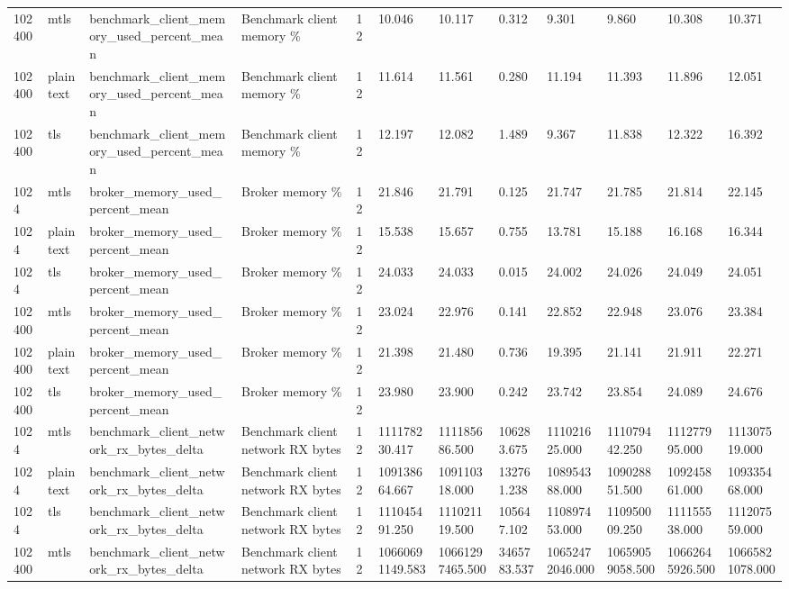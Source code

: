 \begin{longtable}{llllllllllll}
102400 & mtls & benchmark\_client\_memory\_used\_percent\_mean & Benchmark client memory \% & 12 & 10.046 & 10.117 & 0.312 & 9.301 & 9.860 & 10.308 & 10.371 \\
102400 & plaintext & benchmark\_client\_memory\_used\_percent\_mean & Benchmark client memory \% & 12 & 11.614 & 11.561 & 0.280 & 11.194 & 11.393 & 11.896 & 12.051 \\
102400 & tls & benchmark\_client\_memory\_used\_percent\_mean & Benchmark client memory \% & 12 & 12.197 & 12.082 & 1.489 & 9.367 & 11.838 & 12.322 & 16.392 \\
1024 & mtls & broker\_memory\_used\_percent\_mean & Broker memory \% & 12 & 21.846 & 21.791 & 0.125 & 21.747 & 21.785 & 21.814 & 22.145 \\
1024 & plaintext & broker\_memory\_used\_percent\_mean & Broker memory \% & 12 & 15.538 & 15.657 & 0.755 & 13.781 & 15.188 & 16.168 & 16.344 \\
1024 & tls & broker\_memory\_used\_percent\_mean & Broker memory \% & 12 & 24.033 & 24.033 & 0.015 & 24.002 & 24.026 & 24.049 & 24.051 \\
102400 & mtls & broker\_memory\_used\_percent\_mean & Broker memory \% & 12 & 23.024 & 22.976 & 0.141 & 22.852 & 22.948 & 23.076 & 23.384 \\
102400 & plaintext & broker\_memory\_used\_percent\_mean & Broker memory \% & 12 & 21.398 & 21.480 & 0.736 & 19.395 & 21.141 & 21.911 & 22.271 \\
102400 & tls & broker\_memory\_used\_percent\_mean & Broker memory \% & 12 & 23.980 & 23.900 & 0.242 & 23.742 & 23.854 & 24.089 & 24.676 \\
1024 & mtls & benchmark\_client\_network\_rx\_bytes\_delta & Benchmark client network RX bytes & 12 & 111178230.417 & 111185686.500 & 106283.675 & 111021625.000 & 111079442.250 & 111277995.000 & 111307519.000 \\
1024 & plaintext & benchmark\_client\_network\_rx\_bytes\_delta & Benchmark client network RX bytes & 12 & 109138664.667 & 109110318.000 & 132761.238 & 108954388.000 & 109028851.500 & 109245861.000 & 109335468.000 \\
1024 & tls & benchmark\_client\_network\_rx\_bytes\_delta & Benchmark client network RX bytes & 12 & 111045491.250 & 111021119.500 & 105647.102 & 110897453.000 & 110950009.250 & 111155538.000 & 111207559.000 \\
102400 & mtls & benchmark\_client\_network\_rx\_bytes\_delta & Benchmark client network RX bytes & 12 & 10660691149.583 & 10661297465.500 & 3465783.537 & 10652472046.000 & 10659059058.500 & 10662645926.500 & 10665821078.000 \\

\end{longtable}
